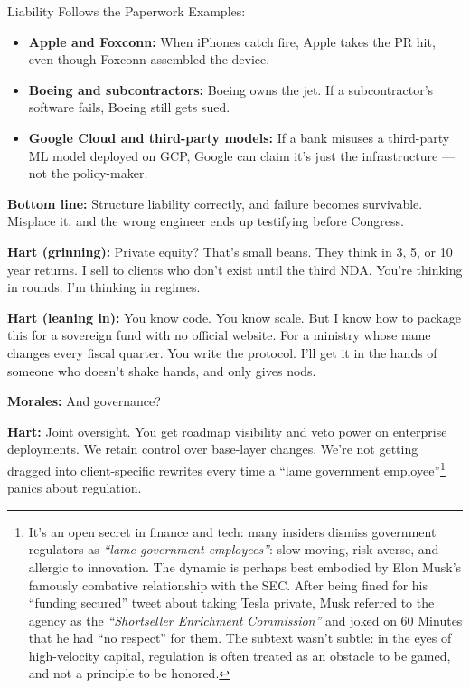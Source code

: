 \begin{TechnicalSidebar}{Liability Follows the Paperwork}
  Examples:

  \medskip

  \begin{itemize}
    \item \textbf{Apple and Foxconn:} When iPhones catch fire, Apple takes the PR hit, even though Foxconn assembled the device.
    \item \textbf{Boeing and subcontractors:} Boeing owns the jet. If a subcontractor’s software fails, Boeing still gets sued.
    \item \textbf{Google Cloud and third-party models:} If a bank misuses a third-party ML model deployed on GCP, Google can claim it's just the infrastructure — not the policy-maker.
  \end{itemize}
  
  \medskip
  
  \textbf{Bottom line:}  
  Structure liability correctly, and failure becomes survivable.  
  Misplace it, and the wrong engineer ends up testifying before Congress.
  
\end{TechnicalSidebar}

\medskip

\textbf{Hart (grinning):}
Private equity? That’s small beans.
They think in 3, 5, or 10 year returns.
I sell to clients who don’t exist until the third NDA.
You’re thinking in rounds. I’m thinking in regimes.

\textbf{Hart (leaning in):}
You know code. You know scale.
But I know how to package this for a sovereign fund with no official website.
For a ministry whose name changes every fiscal quarter.
You write the protocol.
I’ll get it in the hands of someone who doesn’t shake hands, and only gives nods.

\textbf{Morales:}
And governance?

\textbf{Hart:}
Joint oversight.
You get roadmap visibility and veto power on enterprise deployments.
We retain control over base-layer changes.
We’re not getting dragged into client-specific rewrites every time a ``lame government employee''\footnote{
It’s an open secret in finance and tech: many insiders dismiss government regulators as \emph{``lame government employees''}:
slow-moving, risk-averse, and allergic to innovation.
The dynamic is perhaps best embodied by Elon Musk’s famously combative relationship with the SEC.
After being fined for his “funding secured” tweet about taking Tesla private, Musk referred to the agency as the 
\emph{“Shortseller Enrichment Commission”} and joked on 60 Minutes that he had “no respect” for them.
The subtext wasn’t subtle: in the eyes of high-velocity capital, regulation is often treated as an obstacle to be gamed, 
and not a principle to be honored.
}
panics about regulation.

